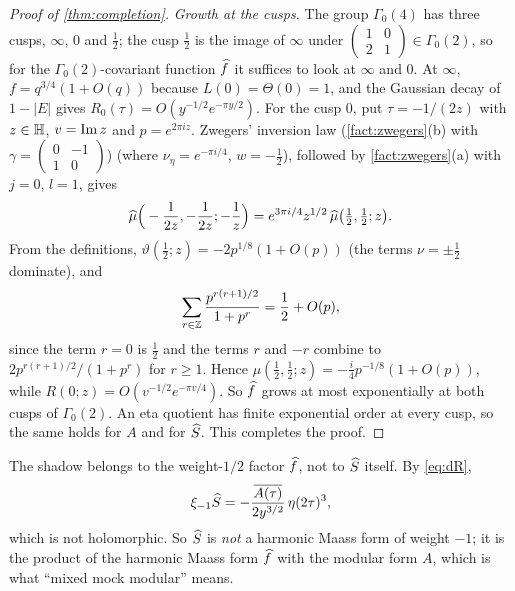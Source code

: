 \begin{proof}[Proof of \cref{thm:completion}]
\emph{Growth at the cusps.} The group $\Gamma_0(4)$ has three cusps, $\infty$,
$0$ and $\frac12$; the cusp $\frac12$ is the image of $\infty$ under
$\left(\begin{smallmatrix}1&0\\2&1\end{smallmatrix}\right)\in\Gamma_0(2)$, so for
the $\Gamma_0(2)$-covariant function $\widehat{f}$ it suffices to look at $\infty$ and
$0$. At $\infty$, $f=q^{3/4}(1+O(q))$ because $L(0)=\Theta(0)=1$, and the Gaussian
decay of $1-|E|$ gives $R_0(\tau)=O(y^{-1/2}e^{-\pi y/2})$. For the cusp $0$, put
$\tau=-1/(2z)$ with $z\in\mathbb{H}$, $v=\operatorname{Im} z$ and $p=e^{2\pi iz}$. Zwegers' inversion
law (\cref{fact:zwegers}(b) with $\gamma=\left(\begin{smallmatrix}0&-1\\1&0\end{smallmatrix}\right)$)
(where $\nu_\eta=e^{-\pi i/4}$, $w=-\frac12$), followed by \cref{fact:zwegers}(a)
with $j=0$, $l=1$, gives
\[
\widehat{\mu}\Big(-\frac1{2z},-\frac1{2z};-\frac1z\Big)=e^{3\pi i/4}z^{1/2}\,\widehat{\mu}\big(\tfrac12,\tfrac12;z\big).
\]
From the definitions, $\vartheta(\frac12;z)=-2p^{1/8}(1+O(p))$ (the terms
$\nu=\pm\frac12$ dominate), and
\[
\sum_{r\in\mathbb{Z}}\frac{p^{r(r+1)/2}}{1+p^r}=\frac12+O(p),
\]
since the term $r=0$ is $\frac12$ and the terms $r$ and $-r$ combine to
$2p^{r(r+1)/2}/(1+p^r)$ for $r\ge1$. Hence
$\mu(\frac12,\frac12;z)=-\frac i4p^{-1/8}(1+O(p))$, while
$R(0;z)=O(v^{-1/2}e^{-\pi v/4})$. So $\widehat{f}$ grows at most exponentially at both
cusps of $\Gamma_0(2)$. An eta quotient has finite exponential order at every
cusp, so the same holds for $A$ and for $\widehat{S}$. This completes the proof.
\end{proof}

\begin{remark}
The shadow belongs to the weight-$1/2$ factor $\widehat{f}$, not to $\widehat{S}$ itself. By
\eqref{eq:dR},
\[
\xi_{-1}\widehat{S}=-\frac{\overline{A(\tau)}}{2y^{3/2}}\,\eta(2\tau)^3,
\]
which is not holomorphic. So $\widehat{S}$ is \emph{not} a harmonic Maass form of
weight $-1$; it is the product of the harmonic Maass form $\widehat{f}$ with the
modular form $A$, which is what ``mixed mock modular'' means.
\end{remark}
